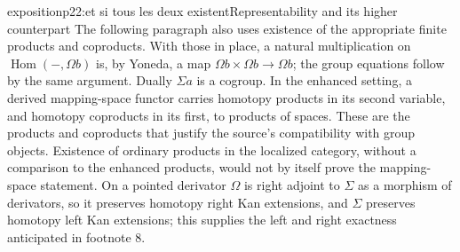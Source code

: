 \begin{dcomment}{exposition}{p22:et si tous les deux existent}{Representability and its higher counterpart}
The following paragraph also uses existence of the appropriate finite products and coproducts. With those in place, a natural multiplication on $\operatorname{Hom}(-,\Omega b)$ is, by Yoneda, a map $\Omega b\times\Omega b\to\Omega b$; the group equations follow by the same argument. Dually $\Sigma a$ is a cogroup. In the enhanced setting, a derived mapping-space functor carries homotopy products in its second variable, and homotopy coproducts in its first, to products of spaces. These are the products and coproducts that justify the source's compatibility with group objects. Existence of ordinary products in the localized category, without a comparison to the enhanced products, would not by itself prove the mapping-space statement. On a pointed derivator $\Omega$ is right adjoint to $\Sigma$ as a morphism of derivators, so it preserves homotopy right Kan extensions, and $\Sigma$ preserves homotopy left Kan extensions; this supplies the left and right exactness anticipated in footnote 8.
\end{dcomment}

